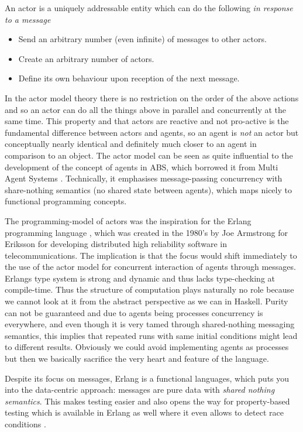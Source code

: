 An actor is a uniquely addressable entity which can do the following \textit{in response to a message}
\begin{itemize}
	\item Send an arbitrary number (even infinite) of messages to other actors.
	\item Create an arbitrary number of actors.
	\item Define its own behaviour upon reception of the next message.
\end{itemize}

In the actor model theory there is no restriction on the order of the above actions and so an actor can do all the things above in parallel and concurrently at the same time. This property and that actors are reactive and not pro-active is the fundamental difference between actors and agents, so an agent is \textit{not} an actor but conceptually nearly identical and definitely much closer to an agent in comparison to an object. The actor model can be seen as quite influential to the development of the concept of agents in ABS, which borrowed it from Multi Agent Systems \cite{wooldridge_introduction_2009}. Technically, it emphasises message-passing concurrency with share-nothing semantics (no shared state between agents), which maps nicely to functional programming concepts.

The programming-model of actors \cite{agha_actors:_1986} was the inspiration for the Erlang programming language \cite{armstrong_erlang_2010}, which was created in the 1980's by Joe Armstrong for Eriksson for developing distributed high reliability software in telecommunications. The implication is that the focus would shift immediately to the use of the actor model for concurrent interaction of agents through messages. Erlangs type system is strong and dynamic and thus lacks type-checking at compile-time. Thus the structure of computation plays naturally no role because we cannot look at it from the abstract perspective as we can in Haskell. Purity can not be guaranteed and due to agents being processes concurrency is everywhere, and even though it is very tamed through shared-nothing messaging semantics, this implies that repeated runs with same initial conditions might lead to different results. Obviously we could avoid implementing agents as processes but then we basically sacrifice the very heart and feature of the language.

Despite its focus on messages, Erlang is a functional languages, which puts you into the data-centric approach: messages are pure data with \textit{shared nothing semantics}. This makes testing easier and also opens the way for property-based testing which is available in Erlang as well where it even allows to detect race conditions \cite{claessen_finding_2009}. 

